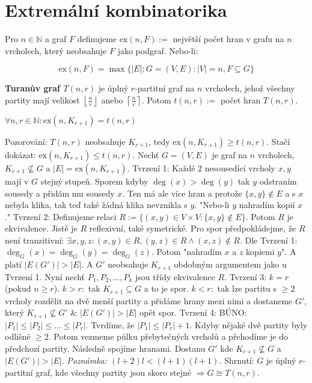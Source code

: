 \chapter{Extremální kombinatorika}

\begin{definice}
	Pro $n \in \mathbb{N}$ a graf $F$ definujeme $\text{ex}(n,F) :=$ největší počet hran v grafu na $n$ vrcholech, který neobsahuje $F$ jako podgraf. Nebo-li:
	
	$$
	\text{ex}(n,F) = \max\{|E|; G = (V,E): |V| = n, F \subseteq G\}
	$$
\end{definice}

\begin{definice}
	\textbf{Turanův graf $T(n,r)$} je úplný $r$-partitní graf na $n$ vrcholech, jehož všechny partity mají velikost $\left\lfloor \frac{n}{r} \right\rfloor$ anebo $\left\lceil \frac{n}{r} \right\rceil$. Potom $t(n,r):=$ počet hran $T(n,r)$.
\end{definice}

\begin{veta}[Turán]
	$\forall n,r \in \mathbb{N}: \text{ex}(n,K_{r+1}) = t(n,r)$
\end{veta}

\begin{dukaz}
	Pozorování: $T(n,r)$ neobsahuje $K_{r+1}$, tedy $\text{ex}(n,K_{r+1}) \geq t(n,r)$. Stačí dokázat: $\text{ex}(n,K_{r+1})\leq t(n,r)$. Nechť $G = (V,E)$ je graf na $n$ vrcholech, $K_{r+1} \nsubseteq G$ a $|E| = \text{ex}(n,K_{r+1})$. Tvrzení 1: Každé 2 nesousedící vrcholy $x,y$ mají v $G$ stejný stupeň. Sporem kdyby $\deg(x) > \deg(y)$ tak $y$ odstraním sousedy a přidám mu sousedy $x$. Ten má ale více hran a protože $\{x,y\} \notin E$ a s $x$ nebyla klika, tak teď také žádná klika nevznikla s $y$. "Nebo-li $y$ nahradím kopií $x$." Tvrzení 2: Definujeme relaci $R := \{(x,y) \in V \times V: \{x,y\} \notin E\}$. Potom $R$ je ekvivalence. Jistě je $R$ reflexivní, také symetrické. Pro spor předpokládejme, že $R$ není tranzitivní: $\exists x,y,z: (x,y) \in R, (y,z) \in R \land (x,z) \notin R$. Dle Tvrzení 1: $\deg_{G}(x) = \deg_{G}(y) = \deg_{G}(z)$. Potom "nahradím $x$ a $z$ kopiemi $y$". A platí $|E(G')| > |E|$. A $G'$ neobsahuje $K_{r+1}$ obdobným argumentem jako u Tvrzení 1. Nyní nechť $P_{1}, P_{2}, \dots, P_{k}$ jsou třídy ekvivalence $R$. Tvrzení 3: $k=r$ (pokud $n \geq r$). $k > r:$ tak $K_{r+1} \subseteq G$ a to je spor. $k < r:$ tak lze partitu s $\geq 2$ vrcholy rozdělit na dvě menší partity a přidáme hrany mezi nimi a dostaneme $G'$, který $K_{r+1} \nsubseteq G'$ \& $|E(G')| > |E|$ opět spor. Tvrzení 4: BÚNO: $|P_{1}| \leq |P_{2}| \leq \dots \leq |P_{r}|$. Tvrdíme, že $|P_{1}| \leq |P_{r}| + 1$. Kdyby nějaké dvě partity byly odlišné $\geq 2$. Potom vezmeme půlku přebytečných vrcholů a přehodíme je do předchozí partity. Následně spojíme hranami. Dostanu $G'$ kde $K_{r+1} \nsubseteq G$ a $|E(G')| > |E|$. \textit{Poznámka: $(l+2) l < (l+1)(l+1)$.} Shrnutí: $G$ je úplný $r$-partitní graf, kde všechny partity jsou skoro stejné $\Rightarrow G \cong T(n,r)$.
\end{dukaz}

